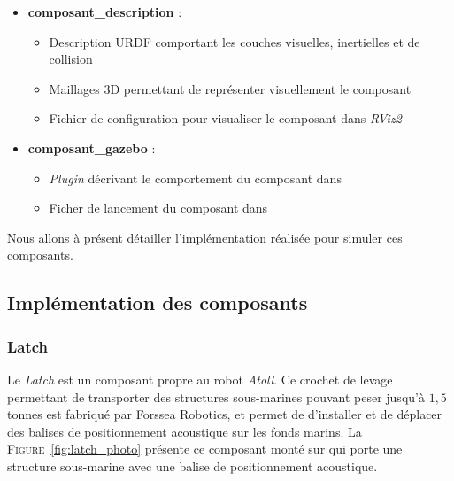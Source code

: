 			\begin{itemize}
				\renewcommand{\labelitemi}{\textbullet}
				\item \textbf{composant\_description} :
				\begin{itemize}[noitemsep]
					\item Description URDF comportant les couches visuelles, inertielles et de collision
					\item Maillages 3D permettant de représenter visuellement le composant
					\item Fichier de configuration pour visualiser le composant dans \textit{RViz2}
				\end{itemize}
				\item \textbf{composant\_gazebo} :
				\begin{itemize}[noitemsep]
					\item \textit{Plugin} décrivant le comportement du composant dans \gazebo{}
					\item Ficher de lancement du composant dans \gazebo{}
				\end{itemize}
			\end{itemize}

		Nous allons à présent détailler l'implémentation réalisée pour simuler ces composants.

		\subsection{Implémentation des composants}

			\subsubsection{Latch}

				Le \textit{Latch} est un composant propre au robot \textit{Atoll}. Ce crochet de levage permettant de transporter des structures sous-marines pouvant peser jusqu'à $1,5$ tonnes est fabriqué par Forssea Robotics, et permet de d'installer et de déplacer des balises de positionnement acoustique sur les fonds marins. La \textsc{Figure}~\ref{fig:latch_photo} présente ce composant monté sur \atoll{} qui porte une structure sous-marine avec une balise de positionnement acoustique.

